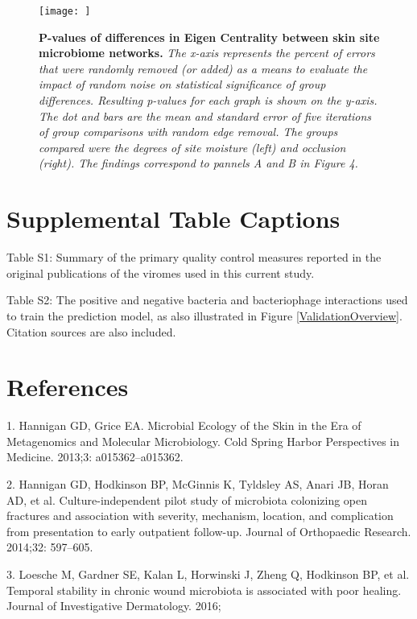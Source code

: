 \documentclass[12pt,]{article}
\begin{document}
\begin{figure}[htbp]
\centering
\texttt{[image: ]}
\caption{\textbf{P-values of differences in Eigen Centrality between
skin site microbiome networks.} \emph{The x-axis represents the percent
of errors that were randomly removed (or added) as a means to evaluate
the impact of random noise on statistical significance of group
differences. Resulting p-values for each graph is shown on the y-axis.
The dot and bars are the mean and standard error of five iterations of
group comparisons with random edge removal. The groups compared were the
degrees of site moisture (left) and occlusion (right). The findings
correspond to pannels A and B in Figure 4.}\label{skindivnoise}}
\end{figure}

\newpage

\section{Supplemental Table Captions}\label{supplemental-table-captions}

Table S1: Summary of the primary quality control measures reported in
the original publications of the viromes used in this current study.

Table S2: The positive and negative bacteria and bacteriophage
interactions used to train the prediction model, as also illustrated in
Figure \ref{ValidationOverview}. Citation sources are also included.

\newpage

\section*{References}\label{references}

\hypertarget{refs}{}
\hypertarget{ref-Hannigan:2013im}{}
1. Hannigan GD, Grice EA. Microbial Ecology of the Skin in the Era of
Metagenomics and Molecular Microbiology. Cold Spring Harbor Perspectives
in Medicine. 2013;3: a015362--a015362.

\hypertarget{ref-Hannigan:2014be}{}
2. Hannigan GD, Hodkinson BP, McGinnis K, Tyldsley AS, Anari JB, Horan
AD, et al. Culture-independent pilot study of microbiota colonizing open
fractures and association with severity, mechanism, location, and
complication from presentation to early outpatient follow-up. Journal of
Orthopaedic Research. 2014;32: 597--605.

\hypertarget{ref-Loesche:2016ev}{}
3. Loesche M, Gardner SE, Kalan L, Horwinski J, Zheng Q, Hodkinson BP,
et al. Temporal stability in chronic wound microbiota is associated with
poor healing. Journal of Investigative Dermatology. 2016;
\end{document}
